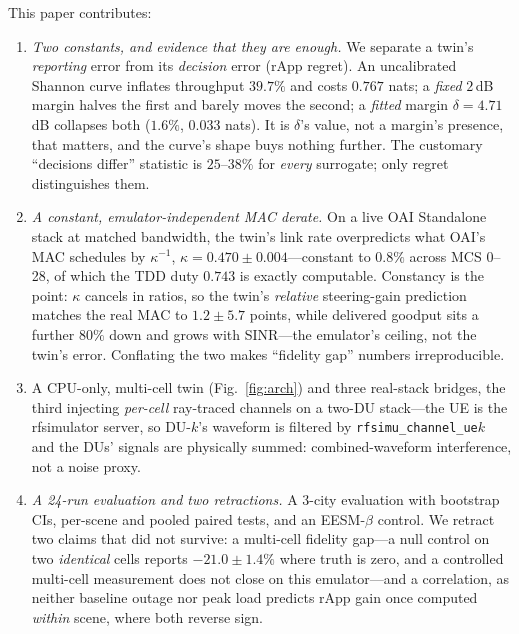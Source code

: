 \documentclass[conference]{IEEEtran}
\begin{document}
This paper contributes:
\begin{enumerate}
\item \emph{Two constants, and evidence that they are enough.} We separate a twin's \emph{reporting} error from its \emph{decision} error (rApp regret). An uncalibrated Shannon curve inflates throughput $39.7\%$ and costs $0.767$ nats; a \emph{fixed} $2$\,dB margin halves the first and barely moves the second; a \emph{fitted} margin $\delta{=}4.71$\,dB collapses both ($1.6\%$, $0.033$ nats). It is $\delta$'s value, not a margin's presence, that matters, and the curve's shape buys nothing further. The customary ``decisions differ'' statistic is $25$--$38\%$ for \emph{every} surrogate; only regret distinguishes them.
\item \emph{A constant, emulator-independent MAC derate.} On a live OAI Standalone stack at matched bandwidth, the twin's link rate overpredicts what OAI's MAC schedules by $\kappa^{-1}$, $\kappa{=}0.470\pm0.004$---constant to $0.8\%$ across MCS 0--28, of which the TDD duty $0.743$ is exactly computable. Constancy is the point: $\kappa$ cancels in ratios, so the twin's \emph{relative} steering-gain prediction matches the real MAC to $1.2\pm5.7$ points, while delivered goodput sits a further $80\%$ down and grows with SINR---the emulator's ceiling, not the twin's error. Conflating the two makes ``fidelity gap'' numbers irreproducible.
\item A CPU-only, multi-cell twin (Fig.~\ref{fig:arch}) and three real-stack bridges, the third injecting \emph{per-cell} ray-traced channels on a two-DU stack---the UE is the rfsimulator server, so DU-$k$'s waveform is filtered by \texttt{rfsimu\_channel\_ue}$k$ and the DUs' signals are physically summed: combined-waveform interference, not a noise proxy.
\item \emph{A 24-run evaluation and two retractions.} A 3-city evaluation with bootstrap CIs, per-scene and pooled paired tests, and an EESM-$\beta$ control. We retract two claims that did not survive: a multi-cell fidelity gap---a null control on two \emph{identical} cells reports $-21.0\pm1.4\%$ where truth is zero, and a controlled multi-cell measurement does not close on this emulator---and a correlation, as neither baseline outage nor peak load predicts rApp gain once computed \emph{within} scene, where both reverse sign.
\end{enumerate}

\end{document}
